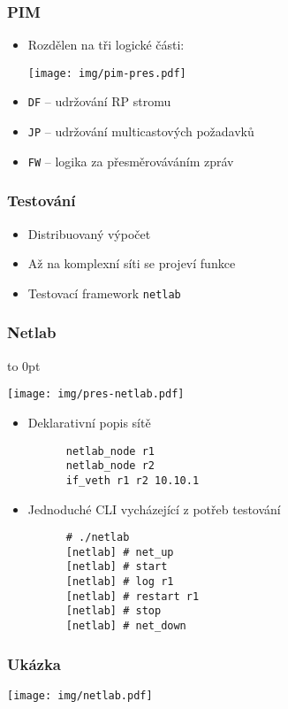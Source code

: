 \documentclass{beamer}
\begin{document}
\begin{frame}\frametitle{PIM}
  \begin{itemize}
    \item Rozdělen na tři logické části: \par
      \medskip
      \begin{center}
      \texttt{[image: img/pim-pres.pdf]}
      \end{center}
    \item \texttt{DF} -- udržování RP stromu
    \item \texttt{JP} -- udržování multicastových požadavků
    \item \texttt{FW} -- logika za přesměrováváním zpráv
  \end{itemize}
\end{frame}

\begin{frame}\frametitle{Testování}
  \begin{itemize}
    \item Distribuovaný výpočet
    \item Až na komplexní síti se projeví funkce
    \item Testovací framework \texttt{netlab}
  \end{itemize}
\end{frame}

\begin{frame}[fragile]\frametitle{Netlab}
   \vbox to 0pt{\vskip 11pt\hfill\texttt{[image: img/pres-netlab.pdf]}\qquad\strut\vss}\nointerlineskip
  \begin{itemize}
    \item Deklarativní popis sítě
\begin{verbatim}
	  netlab_node r1
	  netlab_node r2
	  if_veth r1 r2 10.10.1
\end{verbatim}

    \item Jednoduché CLI vycházející z potřeb testování

\begin{verbatim}
	  # ./netlab
	  [netlab] # net_up
	  [netlab] # start
	  [netlab] # log r1
	  [netlab] # restart r1
	  [netlab] # stop
	  [netlab] # net_down
\end{verbatim}

  \end{itemize}
\end{frame}

\begin{frame}\frametitle{Ukázka}
\texttt{[image: img/netlab.pdf]}
\end{frame}
\end{document}
